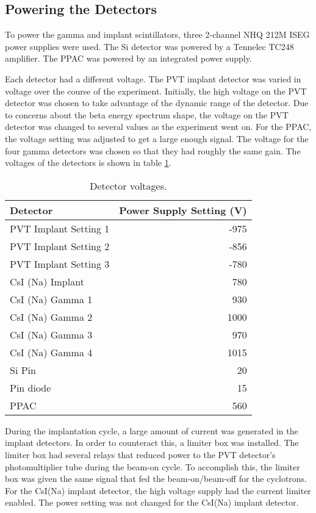 \documentclass[../MaxHughesThesis.tex]{subfiles}
\begin{document}
\subsection{Powering the Detectors}

To power the gamma and implant scintillators, three 2-channel NHQ 212M ISEG power supplies were used.
The Si detector was powered by a Tennelec TC248 amplifier.
The PPAC was powered by an integrated power supply.

Each detector had a different voltage. 
The PVT implant detector was varied in voltage over the course of the experiment.
Initially, the high voltage on the PVT detector was chosen to take advantage of the dynamic range of the detector.
Due to concerns about the beta energy spectrum shape, the voltage on the PVT detector was changed to several values as the experiment went on. 
For the PPAC, the voltage setting was adjusted to get a large enough signal.
The voltage for the four gamma detectors was chosen so that they had roughly the same gain.
The voltages of the detectors is shown in table \ref{tab:detvolt}.
\begin{table}[!hbt]
	\caption{Detector voltages.}
	\centering
		\begin{tabular}{lr}
		Detector & Power Supply Setting (V) \\ \hline
		PVT Implant Setting 1 & -975 \\
		PVT Implant Setting 2 & -856 \\
		PVT Implant Setting 3 & -780 \\
		CsI (Na) Implant & 780 \\ 
		CsI (Na) Gamma 1 & 930 \\
		CsI (Na) Gamma 2 & 1000 \\
		CsI (Na) Gamma 3 & 970 \\
		CsI (Na) Gamma 4 & 1015 \\
		Si Pin & 20 \\
		Pin diode & 15 \\
		PPAC & 560  
		\end{tabular}
	\label{tab:detvolt}
\end{table}

During the implantation cycle, a large amount of current was generated in the implant detectors.
In order to counteract this, a limiter box was installed.
The limiter box had several relays that reduced power to the PVT detector's photomultiplier tube during the beam-on cycle. 
To accomplish this, the limiter box was given the same signal that fed the beam-on/beam-off for the cyclotrons.
For the CsI(Na) implant detector, the high voltage supply had the current limiter enabled.
The power setting was not changed for the CsI(Na) implant detector. 
\end{document}
